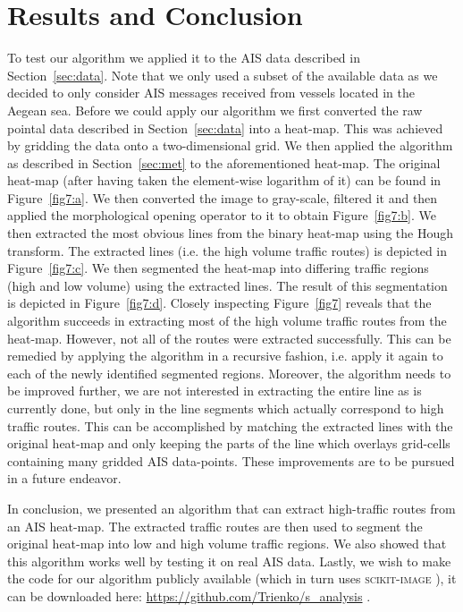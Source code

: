 \documentclass{article}
\begin{document}
\section{Results and Conclusion}
To test our algorithm we applied it to the AIS data described in Section~\ref{sec:data}. Note that we only used a subset of the available data as we decided to only 
consider AIS messages received from vessels located in the Aegean sea. Before we could apply our algorithm we first converted the raw pointal data described in Section~\ref{sec:data} into a heat-map.
This was achieved by gridding the data onto a two-dimensional grid. We then applied the algorithm as described in Section~\ref{sec:met} to the aforementioned heat-map. 
The original heat-map (after having taken the element-wise logarithm of it) can be found in Figure~\ref{fig7:a}. We then converted the image to gray-scale, filtered it and 
then applied the morphological opening operator to it to obtain Figure~\ref{fig7:b}. We then extracted the most obvious lines from the binary heat-map using the Hough transform. The 
extracted lines (i.e. the high volume traffic routes) is depicted in Figure~\ref{fig7:c}. We then segmented the heat-map into differing traffic regions (high and low volume) using the 
extracted lines. The result of this segmentation is depicted in Figure~\ref{fig7:d}. Closely inspecting Figure~\ref{fig7} reveals that the algorithm succeeds in extracting most of the high volume traffic routes from the heat-map.
However, not all of the routes were extracted successfully. This can be remedied by applying the algorithm in a recursive fashion, i.e. apply it again to each of the newly identified segmented regions. Moreover, 
the algorithm needs to be improved further, we are not interested in extracting the entire line as is currently done, but only in the line segments which actually correspond to high 
traffic routes. This can be accomplished by matching the extracted lines with the original heat-map and only keeping the parts of the line 
which overlays grid-cells containing many gridded AIS data-points. These improvements are to be pursued in a future endeavor.
 
In conclusion, we presented an algorithm that can extract high-traffic routes from an AIS heat-map. The extracted traffic routes are then used to segment the original 
heat-map into low and high volume traffic regions. We also showed that this algorithm works well by testing it on real 
AIS data. Lastly, we wish to make the code for our algorithm publicly available (which in turn uses \textsc{scikit-image} \cite{scikitimage}), it can be downloaded here: \url{https://github.com/Trienko/s_analysis} .
\end{document}

